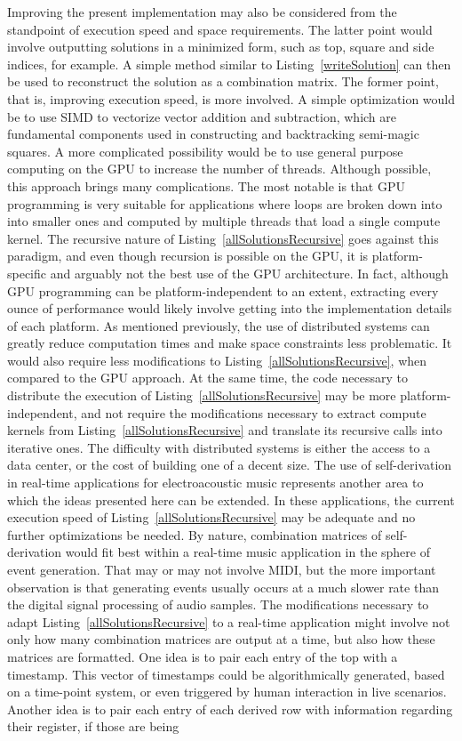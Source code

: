 Improving the present implementation may also be considered from the standpoint of execution speed and space requirements. The latter point would involve outputting solutions in a minimized form, such as top, square and side indices, for example. A simple method similar to Listing~\ref{writeSolution} can then be used to reconstruct the solution as a combination matrix. The former point, that is, improving execution speed, is more involved. A simple optimization would be to use SIMD to vectorize vector addition and subtraction, which are fundamental components used in constructing and backtracking semi-magic squares. A more complicated possibility would be to use general purpose computing on the GPU to increase the number of threads. Although possible, this approach brings many complications. The most notable is that GPU programming is very suitable for applications where loops are broken down into into smaller ones and computed by multiple threads that load a single compute kernel. The recursive nature of Listing~\ref{allSolutionsRecursive} goes against this paradigm, and even though recursion is possible on the GPU, it is platform-specific and arguably not the best use of the GPU architecture. In fact, although GPU programming can be platform-independent to an extent, extracting every ounce of performance would likely involve getting into the implementation details of each platform. As mentioned previously, the use of distributed systems can greatly reduce computation times and make space constraints less problematic. It would also require less modifications to Listing~\ref{allSolutionsRecursive}, when compared to the GPU approach. At the same time, the code necessary to distribute the execution of Listing~\ref{allSolutionsRecursive} may be more platform-independent, and not require the modifications necessary to extract compute kernels from Listing~\ref{allSolutionsRecursive} and translate its recursive calls into iterative ones. The difficulty with distributed systems is either the access to a data center, or the cost of building one of a decent size. The use of self-derivation in real-time applications for electroacoustic music represents another area to which the ideas presented here can be extended. In these applications, the current execution speed of Listing~\ref{allSolutionsRecursive} may be adequate and no further optimizations be needed. By nature, combination matrices of self-derivation would fit best within a real-time music application in the sphere of event generation. That may or may not involve MIDI, but the more important observation is that generating events usually occurs at a much slower rate than the digital signal processing of audio samples. The modifications necessary to adapt Listing~\ref{allSolutionsRecursive} to a real-time application might involve not only how many combination matrices are output at a time, but also how these matrices are formatted. One idea is to pair each entry of the top with a timestamp. This vector of timestamps could be algorithmically generated, based on a time-point system, or even triggered by human interaction in live scenarios. Another idea is to pair each entry of each derived row with information regarding their register, if those are being 